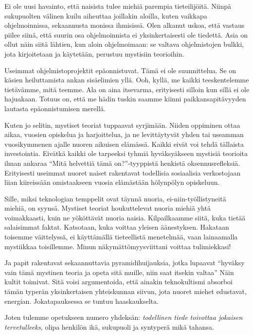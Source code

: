 Ei ole uusi havainto, että naisista tulee miehiä parempia tieteilijöitä. Niinpä sukupuolten välinen kuilu aiheuttaa joillakin aloilla, kuten vaikkapa ohjelmoinnissa, sekaannusta monissa ihmisissä. Olen alkanut uskoa, että vastaus piilee siinä, että suurin osa ohjelmoinnista ei yksinkertaisesti ole tiedettä. Asia on ollut näin siitä lähtien, kun aloin ohjelmoimaan: se valtava ohjelmistojen bulkki, jota kirjoitetaan ja käytetään, perustuu mystisiin teorioihin.

Useimmat ohjelmistoprojektit epäonnistuvat. Tämä ei ole suunnittelua. Se on käsien heiluttamista ankan sisäelimien yllä. Ooh, kyllä, me kaikki teeskentelemme tietävämme, mitä teemme. Ala on aina itsevarma, erityisesti silloin kun sillä ei ole hajuakaan. Totuus on, että me hädin tuskin saamme kiinni paikkansapitävyyden lautasta epäonnistumisen merellä.

Kuten jo selitin, mystiset teoriat tuppaavat syrjimään. Niiden oppiminen ottaa aikaa, vuosien opiskelua ja harjoittelua, ja ne levittäytyvät yhden tai useamman vuosikymmenen ajalle nuoren aikuisen elämässä. Kaikki eivät voi tehdä tällaista investointia. Eivätkä kaikki ole tarpeeksi tyhmiä hyväksyäkseen mystisiä teorioita ilman ankaraa ``Mitä helvettiä tämä on?''-tyyppistä henkistä oksennusrefleksiä. Erityisesti useimmat nuoret naiset rakentavat todellisia sosiaalisia verkostojaan liian kiireissään omistaakseen vuosia elämästään hölynpölyn opiskeluun.

Sille, miksi teknologian temppelit ovat täynnä nuoria, ei-niin-työllistyneitä miehiä, on syynsä. Mystiset teoriat houkuttelevat nuoria miehiä yhtä voimakkaasti, kuin ne yököttävät nuoria naisia. Kilpailkaamme siitä, kuka tietää salaisimmat faktat. Katsotaan, kuka voittaa yleisen äänestyksen. Hakataan toisemme väittelyssä, ei käyttämällä tieteellistä menetelmää, vaan lainaamalla mystiikkaa toisillemme. Minun näkymättömyysviittani voittaa tulimiekkasi!

Ja papit rakentavat sekaannuttavia pyramidihuijauksia, jotka lupaavat ``hyväksy vain tämä mystinen teoria ja opeta sitä muille, niin saat itsekin valtaa'' Näin kultit toimivat. Sitä voisi argumentoida, että ainakin teknokultismi absorboi tämän typerän yksinkertaisen yhteiskunnan siivun, jota nuoret miehet edustavat, energian. Jokatapauksessa se tuntuu haaskaukselta.

Joten tulemme opetukseen numero yhdeksän: \emph{todellinen tiede toivottaa jokaisen tervetulleeks,} olipa henkilön ikä, sukupuoli ja syntyperä mikä tahansa.













